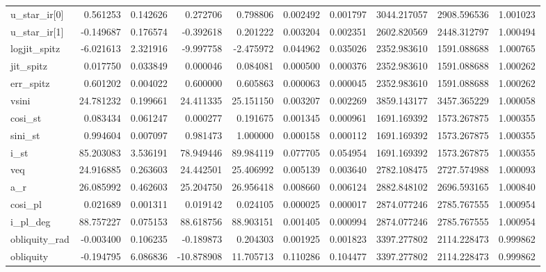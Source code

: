 \begin{tabular}{lrrrrrrrrr}
u\_star\_ir[0]  &    0.561253 &    0.142626 &    0.272706 &     0.798806 &   0.002492 &  0.001797 &  3044.217057 &  2908.596536 &  1.001023 \\
u\_star\_ir[1]  &   -0.149687 &    0.176574 &   -0.392618 &     0.201222 &   0.003204 &  0.002351 &  2602.820569 &  2448.312797 &  1.000494 \\
logjit\_spitz  &   -6.021613 &    2.321916 &   -9.997758 &    -2.475972 &   0.044962 &  0.035026 &  2352.983610 &  1591.088688 &  1.000765 \\
jit\_spitz     &    0.017750 &    0.033849 &    0.000046 &     0.084081 &   0.000500 &  0.000376 &  2352.983610 &  1591.088688 &  1.000262 \\
err\_spitz     &    0.601202 &    0.004022 &    0.600000 &     0.605863 &   0.000063 &  0.000045 &  2352.983610 &  1591.088688 &  1.000262 \\
vsini         &   24.781232 &    0.199661 &   24.411335 &    25.151150 &   0.003207 &  0.002269 &  3859.143177 &  3457.365229 &  1.000058 \\
cosi\_st       &    0.083434 &    0.061247 &    0.000277 &     0.191675 &   0.001345 &  0.000961 &  1691.169392 &  1573.267875 &  1.000355 \\
sini\_st       &    0.994604 &    0.007097 &    0.981473 &     1.000000 &   0.000158 &  0.000112 &  1691.169392 &  1573.267875 &  1.000355 \\
i\_st          &   85.203083 &    3.536191 &   78.949446 &    89.984119 &   0.077705 &  0.054954 &  1691.169392 &  1573.267875 &  1.000355 \\
veq           &   24.916885 &    0.263603 &   24.442501 &    25.406992 &   0.005139 &  0.003640 &  2782.108475 &  2727.574988 &  1.000093 \\
a\_r           &   26.085992 &    0.462603 &   25.204750 &    26.956418 &   0.008660 &  0.006124 &  2882.848102 &  2696.593165 &  1.000840 \\
cosi\_pl       &    0.021689 &    0.001311 &    0.019142 &     0.024105 &   0.000025 &  0.000017 &  2874.077246 &  2785.767555 &  1.000954 \\
i\_pl\_deg      &   88.757227 &    0.075153 &   88.618756 &    88.903151 &   0.001405 &  0.000994 &  2874.077246 &  2785.767555 &  1.000954 \\
obliquity\_rad &   -0.003400 &    0.106235 &   -0.189873 &     0.204303 &   0.001925 &  0.001823 &  3397.277802 &  2114.228473 &  0.999862 \\
obliquity     &   -0.194795 &    6.086836 &  -10.878908 &    11.705713 &   0.110286 &  0.104477 &  3397.277802 &  2114.228473 &  0.999862 \\
\bottomrule
\end{tabular}
